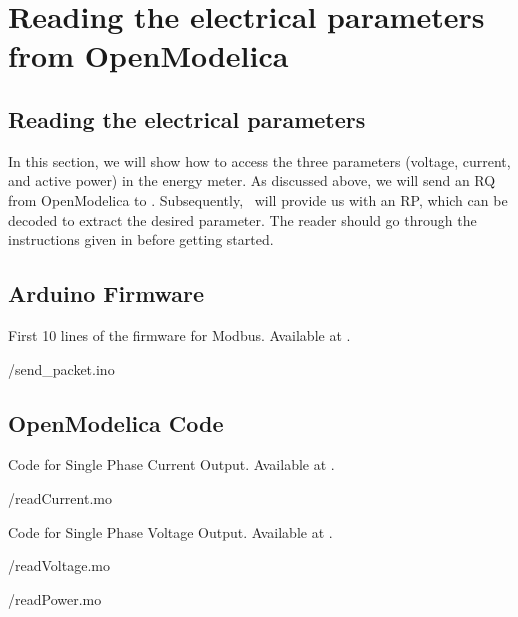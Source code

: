 \section{Reading the electrical parameters from OpenModelica}
\subsection{Reading the electrical parameters}
In this section, we will show how to access the three parameters (voltage, current, and active power) in the energy meter. As discussed above, we will send an RQ from OpenModelica to \arduino. Subsequently, \arduino\ will provide us with an RP, which can be decoded to extract the desired parameter. The reader should go through the instructions given in  before getting started. 

\subsection{Arduino Firmware}
\label{sec:firmware-modbus}
\begin{ardcode}
  {First 10 lines of the firmware for Modbus.  Available at
    .}
  \label{ard:firmware-modbus}
  
  {\LocMODardcode/send_packet.ino}
\end{ardcode}

\subsection{OpenModelica Code}
\label{sec:modbus-OpenModelica-code}

\begin{OpenModelicacode}
  {Code for Single Phase Current Output.
    Available at .}
  \label{OpenModelica:current-modbus}
  
  {\LocMODOpenModelicacode/readCurrent.mo}
\end{OpenModelicacode}

\begin{OpenModelicacode}
  {Code for Single Phase Voltage Output.
    Available at .}
  \label{OpenModelica:voltage-modbus}
  
  {\LocMODOpenModelicacode/readVoltage.mo}
\end{OpenModelicacode}

\begin{OpenModelicacode}
  \label{OpenModelica:modbus-power}
  
  {\LocMODOpenModelicacode/readPower.mo}
\end{OpenModelicacode}

